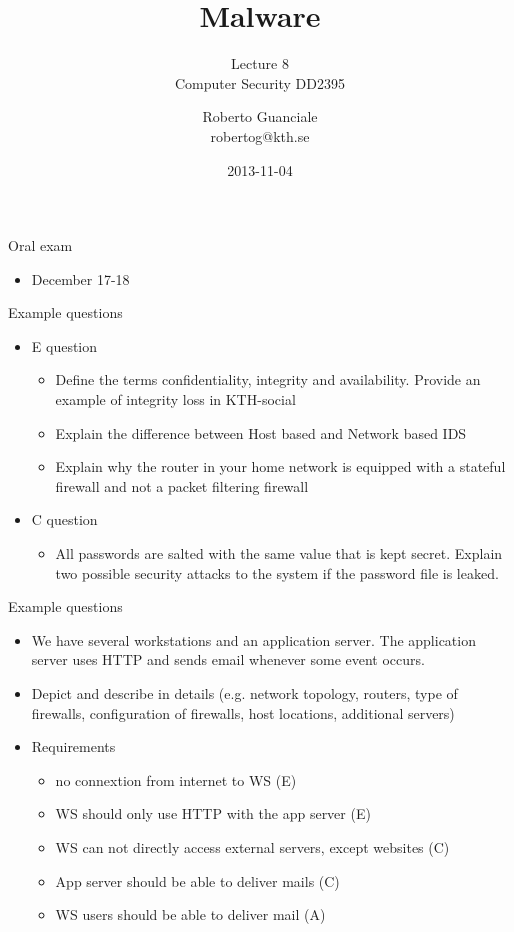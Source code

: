 \documentclass{beamer}
\title{Malware}
\subtitle{Lecture 8 \\ Computer Security DD2395}
\author[R. Guanciale]{
  Roberto Guanciale\\
  robertog@kth.se
}
\date{2013-11-04}
\begin{document}
\begin{frame}[plain]
  \titlepage
\end{frame}

\begin{frame}{Oral exam}
  \begin{itemize}
  \item December 17-18
  \end{itemize}
\end{frame}

\begin{frame}{Example questions}
  \begin{itemize}
  \item E question
    \begin{itemize}
    \item Define the terms confidentiality, integrity and availability.
      Provide an example of integrity loss in KTH-social
    \item Explain the difference between Host based and Network based IDS
    \item Explain why the router in your home network is equipped with a
      stateful firewall and not a packet filtering firewall
    \end{itemize}
  \item C question
    \begin{itemize}
    \item All passwords are salted with the same value that is kept secret. Explain two
      possible security attacks to the system if the password file is leaked.
    \end{itemize}
  \end{itemize}
\end{frame}

\begin{frame}{Example questions}
  \begin{itemize}
   \item We have several workstations and an application server.
    The application server uses HTTP and sends email whenever some event occurs.
  \item Depict and describe in details (e.g. network topology,
    routers, type of firewalls, configuration of firewalls, host locations, additional
    servers)
  \item Requirements
    \begin{itemize}
    \item no connextion from internet to WS (E)
    \item WS should only use HTTP with the app server (E)
    \item WS can not directly access external servers, except websites (C)
    \item App server should be able to deliver mails (C)
    \item WS users should be able to deliver mail (A)
    \end{itemize}
  \end{itemize}
\end{frame}
\end{document}
